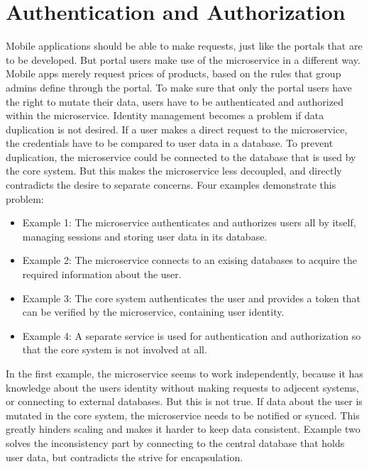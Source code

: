 \section{Authentication and Authorization}
Mobile applications should be able to make requests, just like the portals that are to be developed. But portal users make use of the microservice in a different way. Mobile apps merely request prices of products, based on the rules that group admins define through the portal. To make sure that only the portal users have the right to mutate their data, users have to be authenticated and authorized within the microservice. Identity management becomes a problem if data duplication is not desired. If a user makes a direct request to the microservice, the credentials have to be compared to user data in a database. To prevent duplication, the microservice could be connected to the database that is used by the core system. But this makes the microservice less decoupled, and directly contradicts the desire to separate concerns. Four examples demonstrate this problem:

\begin{itemize}
	\item Example 1: The microservice authenticates and authorizes users all by itself, managing sessions and storing user data in its database.
	\item Example 2: The microservice connects to an exising databases to acquire the required information about the user.
	\item Example 3: The core system authenticates the user and provides a token that can be verified by the microservice, containing user identity.
	\item Example 4: A separate service is used for authentication and authorization so that the core system is not involved at all.
\end{itemize}

In the first example, the microservice seems to work independently, because it has knowledge about the users identity without making requests to adjecent systems, or connecting to external databases. But this is not true. If data about the user is mutated in the core system, the microservice needs to be notified or synced. This greatly hinders scaling and makes it harder to keep data consistent. Example two solves the inconsistency part by connecting to the central database that holds user data, but contradicts the strive for encapsulation.

